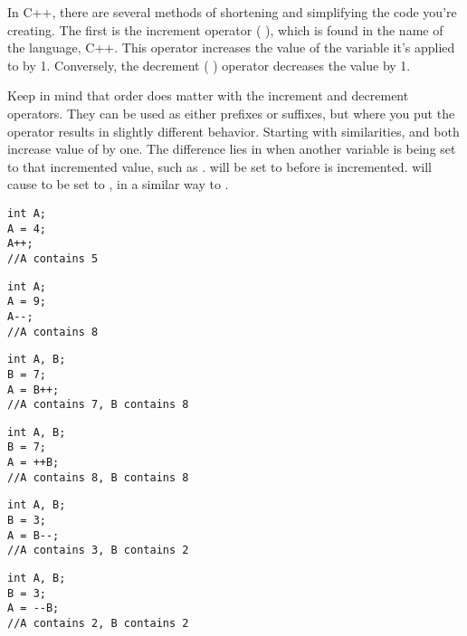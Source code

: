 
In C++, there are several methods of shortening and simplifying the code you're creating. 
The first is the increment operator ( \Code{++} ), which is found in the name of the language, C++.
This operator increases the value of the variable it's applied to by 1. 
Conversely, the decrement ( \Code{--} ) operator decreases the value by 1.

Keep in mind that order does matter with the increment and decrement operators. 
They can be used as either prefixes or suffixes, but where you put the operator results in slightly different behavior. 
Starting with similarities,  and  both increase value of  by one. 
The difference lies in when another variable is being set to that incremented value, such as . 
 will be set to  before  is incremented. 
 will cause  to be set to , in a similar way to .

\noindent\begin{minipage}{\linewidth}\begin{lstlisting}
int A;
A = 4;
A++;
//A contains 5
\end{lstlisting}\end{minipage}
\noindent\begin{minipage}{\linewidth}\begin{lstlisting}
int A;
A = 9;
A--;
//A contains 8
\end{lstlisting}\end{minipage}
\noindent\begin{minipage}{\linewidth}\begin{lstlisting}
int A, B;
B = 7;
A = B++;
//A contains 7, B contains 8
\end{lstlisting}\end{minipage}
\noindent\begin{minipage}{\linewidth}\begin{lstlisting}
int A, B;
B = 7;
A = ++B;
//A contains 8, B contains 8
\end{lstlisting}\end{minipage}
\noindent\begin{minipage}{\linewidth}\begin{lstlisting}
int A, B;
B = 3;
A = B--;
//A contains 3, B contains 2
\end{lstlisting}\end{minipage}
\noindent\begin{minipage}{\linewidth}\begin{lstlisting}
int A, B;
B = 3;
A = --B;
//A contains 2, B contains 2
\end{lstlisting}\end{minipage}

